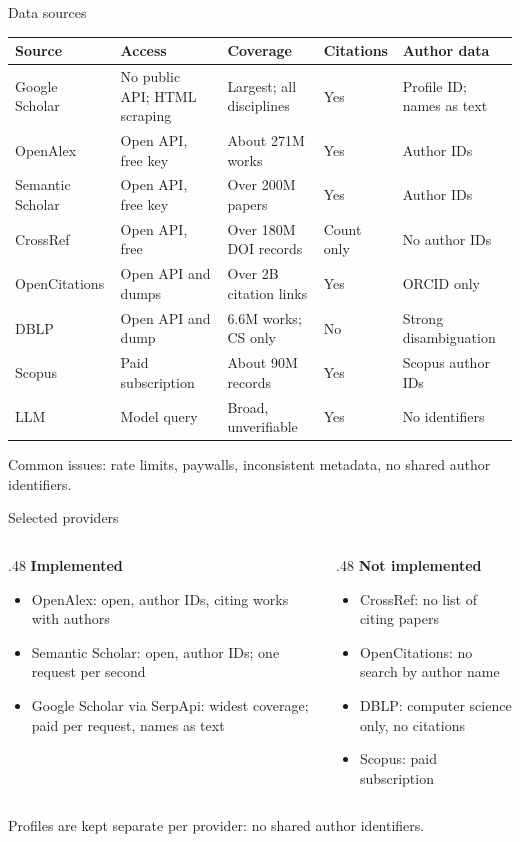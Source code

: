 \documentclass[aspectratio=169,11pt]{beamer}
\begin{document}
\begin{frame}{Data sources}
  \scriptsize
  \begin{tabularx}{\textwidth}{@{}lXXll@{}}
    \toprule
    Source & Access & Coverage & Citations & Author data \\
    \midrule
    Google Scholar & No public API; HTML scraping & Largest; all disciplines & Yes & Profile ID; names as text \\
    OpenAlex & Open API, free key & About 271M works & Yes & Author IDs \\
    Semantic Scholar & Open API, free key & Over 200M papers & Yes & Author IDs \\
    CrossRef & Open API, free & Over 180M DOI records & Count only & No author IDs \\
    OpenCitations & Open API and dumps & Over 2B citation links & Yes & ORCID only \\
    DBLP & Open API and dump & 6.6M works; CS only & No & Strong disambiguation \\
    Scopus & Paid subscription & About 90M records & Yes & Scopus author IDs \\
    LLM & Model query & Broad, unverifiable & Yes & No identifiers \\
    \bottomrule
  \end{tabularx}
  \vspace{1ex}

  \normalsize
  Common issues: rate limits, paywalls, inconsistent metadata, no shared author identifiers.
\end{frame}

\begin{frame}{Selected providers}
  \begin{columns}[T]
    \begin{column}{.48\textwidth}
      \textbf{Implemented}
      \begin{itemize}
        \item \alert{OpenAlex}: open, author IDs, citing works with authors
        \item \alert{Semantic Scholar}: open, author IDs; one request per second
        \item \alert{Google Scholar} via SerpApi: widest coverage; paid per request, names as text
      \end{itemize}
    \end{column}
    \begin{column}{.48\textwidth}
      \textbf{Not implemented}
      \begin{itemize}
        \item CrossRef: no list of citing papers
        \item OpenCitations: no search by author name
        \item DBLP: computer science only, no citations
        \item Scopus: paid subscription
      \end{itemize}
    \end{column}
  \end{columns}
  \vspace{1em}
  Profiles are kept separate per provider: no shared author identifiers.
\end{frame}
\end{document}

